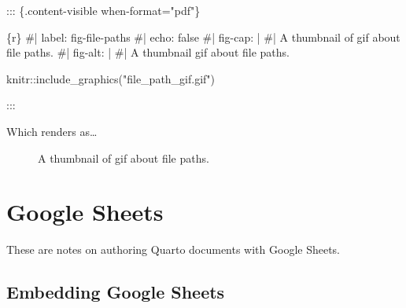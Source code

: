 \documentclass[
  letterpaper,
  DIV=11,
  numbers=noendperiod]{scrreprt}
\newenvironment{Shaded}{\begin{snugshade}}{\end{snugshade}}
\newcommand{\InformationTok}[1]{\textcolor[rgb]{0.37,0.37,0.37}{#1}}
\newcommand{\NormalTok}[1]{\textcolor[rgb]{0.00,0.23,0.31}{#1}}
\begin{document}
\begin{Shaded}
\begin{Highlighting}[]

\NormalTok{::: \{.content{-}visible when{-}format="pdf"\}}

\InformationTok{\textasciigrave{}\textasciigrave{}\textasciigrave{}\{r\}}
\InformationTok{\#| label: fig{-}file{-}paths}
\InformationTok{\#| echo: false}
\InformationTok{\#| fig{-}cap: |}
\InformationTok{\#|   A thumbnail of gif about file paths.}
\InformationTok{\#| fig{-}alt: |}
\InformationTok{\#|   A thumbnail gif about file paths.}

\InformationTok{knitr::include\_graphics("file\_path\_gif.gif")}
\InformationTok{\textasciigrave{}\textasciigrave{}\textasciigrave{}}

\NormalTok{:::}
\end{Highlighting}
\end{Shaded}

Which renders as\ldots{}

\begin{figure}


\caption{\label{fig-file-paths_thumb}A thumbnail of gif about file
paths.}

\end{figure}%

\chapter{Google Sheets}\label{google-sheets}

These are notes on authoring Quarto documents with Google Sheets.

\section{Embedding Google Sheets}\label{embedding-google-sheets}
\end{document}
